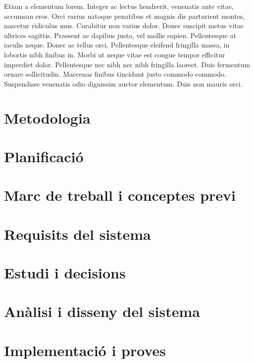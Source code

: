 \documentclass[a4paper,12pt,twoside]{ThesisStyle}
\begin{document}
Etiam a elementum lorem. Integer ac lectus hendrerit, venenatis ante vitae, accumsan eros. Orci varius natoque penatibus et magnis dis parturient montes, nascetur ridiculus mus. Curabitur non varius dolor. Donec suscipit metus vitae ultrices sagittis. Praesent ac dapibus justo, vel mollis sapien. Pellentesque at iaculis neque. Donec ac tellus orci. Pellentesque eleifend fringilla massa, in lobortis nibh finibus in. Morbi ut neque vitae est congue tempor efficitur imperdiet dolor. Pellentesque nec nibh nec nibh fringilla laoreet. Duis fermentum ornare sollicitudin. Maecenas finibus tincidunt justo commodo commodo. Suspendisse venenatis odio dignissim auctor elementum. Duis non mauris orci.



\chapter{Metodologia}
\label{chp:metodologia}



\chapter{Planificació}
\label{chp:planificació}



\chapter{Marc de treball i conceptes previ}
\label{chp:marcdetreball}



\chapter{Requisits del sistema}
\label{chp:requisits}



\chapter{Estudi i decisions}
\label{chp:estudi}



\chapter{Anàlisi i disseny del sistema}
\label{chp:analisi}



\chapter{Implementació i proves}
\label{chp:implementacio}
\end{document}
